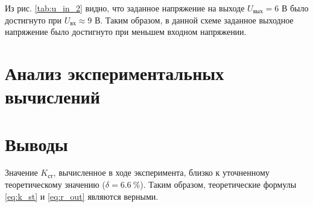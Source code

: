 Из рис. \ref{tab:u_in_2} видно, что заданное напряжение на выходе $U_\text{вых} = 6$ В было достигнуто при $U_\text{вх} \approx 9$ В. Таким образом, в данной схеме заданное выходное напряжение было достигнуто при меньшем входном напряжении.

\section{Анализ экспериментальных вычислений}

\section{Выводы}

Значение $K_\text{ст}$, вычисленное в ходе эксперимента, близко к уточненному теоретическому значению ($\delta = 6.6~\%$). Таким образом, теоретические формулы \ref{eq:k_st} и \ref{eq:r_out}  являются верными.

